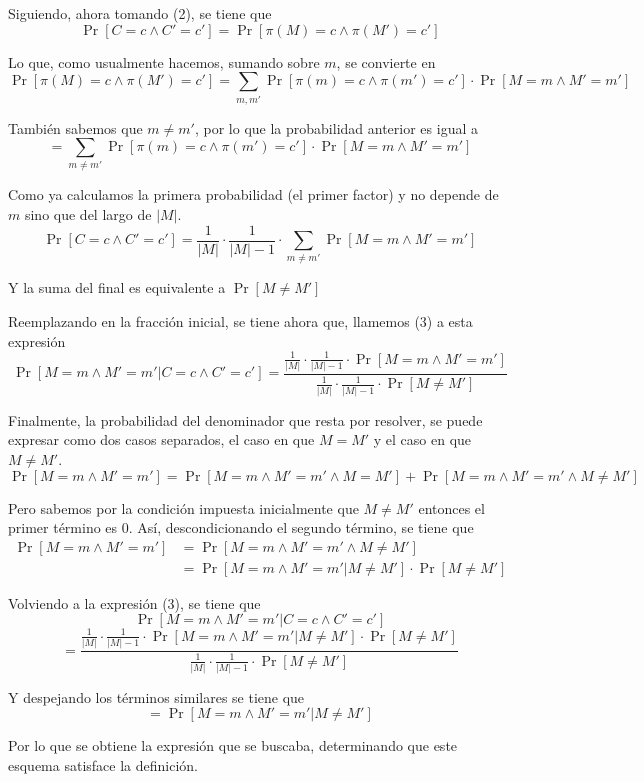 \documentclass[twoside]{tareas}
\begin{document}
\begin{enumerate}
    Siguiendo, ahora tomando (2), se tiene que
    $$\Pr[C=c \wedge C'=c'] = \Pr[\pi(M)=c \wedge \pi(M')=c']$$

    Lo que, como usualmente hacemos, sumando sobre $m$, se convierte en
    $$\Pr[\pi(M)=c \wedge \pi(M')=c'] = \sum_{m, m'} \Pr[\pi(m)=c \wedge \pi(m')=c'] \cdot \Pr[M=m \wedge M'=m']$$

    También sabemos que $m \neq m'$, por lo que la probabilidad anterior es igual a
    $$ = \sum_{m \neq m'} \Pr[\pi(m)=c \wedge \pi(m')=c'] \cdot \Pr[M=m \wedge M'=m']$$

    Como ya calculamos la primera probabilidad (el primer factor) y no depende de $m$ sino que del largo de $|M|$.
    $$\Pr[C=c \wedge C'=c'] = \frac{1}{|M|} \cdot \frac{1}{|M| - 1} \cdot \sum_{m \neq m'} \Pr[M=m \wedge M'=m']$$

    Y la suma del final es equivalente a $\Pr[M \neq M']$

    Reemplazando en la fracción inicial, se tiene ahora que, llamemos (3) a esta expresión
    $$\Pr[M=m \wedge M'=m' | C=c \wedge C'=c'] = \frac{\frac{1}{|M|} \cdot \frac{1}{|M| - 1} \cdot \Pr[M=m \wedge M'=m']}{\frac{1}{|M|} \cdot \frac{1}{|M| - 1} \cdot \Pr[M \neq M']}$$

    Finalmente, la probabilidad del denominador que resta por resolver, se puede expresar como dos casos separados, el caso en que $M = M'$ y el caso en que $M \neq M'$.
    $$\Pr[M=m \wedge M'=m'] = \Pr[M=m \wedge M'=m' \wedge M = M'] + \Pr[M=m \wedge M'=m' \wedge M \neq M']$$

    Pero sabemos por la condición impuesta inicialmente que $M \neq M'$ entonces el primer término es 0. Así, descondicionando el segundo término, se tiene que
    \begin{align*}
        \Pr[M=m \wedge M'=m'] & = \Pr[M=m \wedge M'=m' \wedge M \neq M']\\
        & = \Pr[M=m \wedge M'=m' | M \neq M'] \cdot \Pr[M \neq M']
    \end{align*}

    Volviendo a la expresión (3), se tiene que
    $$\Pr[M=m \wedge M'=m' | C=c \wedge C'=c']$$ $$= \frac{\frac{1}{|M|} \cdot \frac{1}{|M| - 1} \cdot \Pr[M=m \wedge M'=m' | M \neq M'] \cdot \Pr[M \neq M']}{\frac{1}{|M|} \cdot \frac{1}{|M| - 1} \cdot \Pr[M \neq M']}$$

    Y despejando los términos similares se tiene que
    $$ = \Pr[M=m \wedge M'=m' | M \neq M']$$

    Por lo que se obtiene la expresión que se buscaba, determinando que este esquema satisface la definición.

\end{enumerate}
\end{document}
